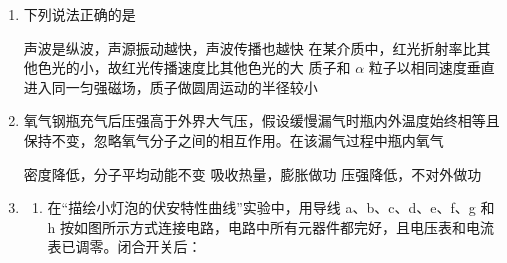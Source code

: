 \documentclass[\gkver]{gaokaozhenti}
\begin{document}
\begin{enumerate}
两卫星相比，土卫十

{绕土星做圆周运动的周期较大}
{绕土星做圆周运动的向心加速度较大}
{动能较大}


\item
下列说法正确的是

{声波是纵波，声源振动越快，声波传播也越快}
{在某介质中，红光折射率比其他色光的小，故红光传播速度比其他色光的大}
{质子和 $\alpha$ 粒子以相同速度垂直进入同一匀强磁场，质子做圆周运动的半径较小}


\item
氧气钢瓶充气后压强高于外界大气压，假设缓慢漏气时瓶内外温度始终相等且保持不变，忽略氧气分子之间的相互作用。在该漏气过程中瓶内氧气

{密度降低，分子平均动能不变}
{吸收热量，膨胀做功}
{压强降低，不对外做功}


\item
\begin{enumerate}
	\item
	在“描绘小灯泡的伏安特性曲线”实验中，用导线 a、b、c、d、e、f、g 和 h 按如图所示方式连接电路，电路中所有元器件都完好，且电压表和电流表已调零。闭合开关后：




\end{enumerate}
\end{enumerate}
\end{document}
